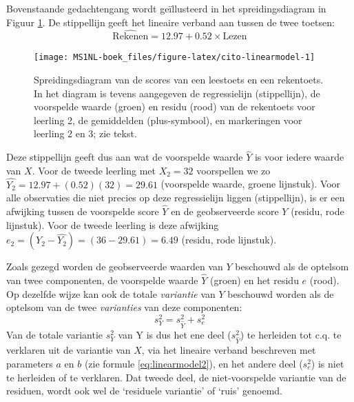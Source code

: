 \documentclass[
]{book}
\begin{document}
Bovenstaande gedachtengang wordt geïllusteerd in het spreidingsdiagram
in Figuur \ref{fig:cito-linearmodel}. De stippellijn geeft het lineaire
verband aan tussen de twee toetsen:
\begin{equation}
    \widehat{\textrm{Rekenen}} = 12.97 + 0.52 \times \textrm{Lezen}
  \label{eq:cito-linearmodel}
\end{equation}

\begin{figure}

{\centering \texttt{[image: MS1NL-boek\_files/figure-latex/cito-linearmodel-1]} 

}

\caption{Spreidingsdiagram van de scores van een leestoets en een rekentoets. In het diagram is tevens aangegeven de regressielijn (stippellijn), de voorspelde waarde (groen) en residu (rood) van de rekentoets voor leerling 2, de gemiddelden (plus-symbool), en markeringen voor leerling 2 en 3; zie tekst.}\label{fig:cito-linearmodel}
\end{figure}

Deze stippellijn geeft dus aan wat de voorspelde waarde \(\widehat{Y}\) is
voor iedere waarde van \(X\). Voor de tweede leerling met \(X_2 = 32\)
voorspellen we zo \(\widehat{Y_2} = 12.97 + (0.52) (32) = 29.61\)
(voorspelde waarde, groene lijnstuk). Voor alle observaties die niet
precies op deze regressielijn liggen (stippellijn),
is er een afwijking tussen de voorspelde
score \(\widehat{Y}\) en de geobserveerde score \(Y\) (residu, rode
lijnstuk). Voor de tweede leerling is deze afwijking
\(e_2 = (Y_2 - \widehat{Y_2}) = (36-29.61) = 6.49\) (residu, rode
lijnstuk).

Zoals gezegd worden de geobserveerde waarden van \(Y\) beschouwd als de
optelsom van twee componenten, de voorspelde waarde \(\widehat{Y}\)
(groen) en het residu \(e\) (rood). Op dezelfde wijze kan ook de totale
\emph{variantie} van \(Y\) beschouwd worden als de optelsom van de twee
\emph{varianties} van deze componenten:
\begin{equation}
    s^2_{Y} = s^2_{\widehat{Y}} + s^2_e
  \label{eq:variance-pred-res}
\end{equation}
Van de totale variantie
\(s^2_Y\) van Y is dus het ene deel (\(s^2_{\widehat{Y}}\)) te herleiden tot
c.q. te verklaren uit de variantie van \(X\), via het lineaire verband
beschreven met parameters \(a\) en \(b\) (zie
formule \eqref{eq:linearmodel2}), en het andere deel (\(s^2_e\)) is niet te
herleiden of te verklaren. Dat tweede deel, de niet-voorspelde variantie
van de residuen, wordt ook wel de `residuele variantie' of `ruis'
genoemd.
\end{document}
